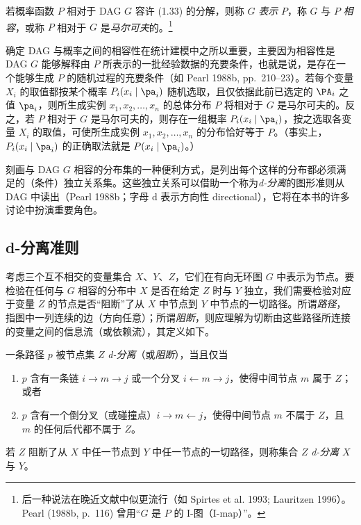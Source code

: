 \begin{definition}[马尔可夫相容]
若概率函数 $P$ 相对于 DAG $G$ 容许 \textup{(1.33)} 的分解，则称 $G$ \emph{表示} $P$，称 $G$ 与 $P$ \emph{相容}，或称 $P$ 相对于 $G$ 是\emph{马尔可夫}的。\footnote{后一种说法在晚近文献中似更流行（如 Spirtes et al. 1993; Lauritzen 1996）。Pearl (1988b, p.~116) 曾用“$G$ 是 $P$ 的 I-图（I-map）”。}
\end{definition}

确定 DAG 与概率之间的相容性在统计建模中之所以重要，主要因为相容性是 DAG $G$ 能够解释由 $P$ 所表示的一批经验数据的充要条件，也就是说，是存在一个能够生成 $P$ 的随机过程的充要条件（如 Pearl 1988b, pp.~210--23）。若每个变量 $X_i$ 的取值都按某个概率 $P_i(x_i\mid\pa_i)$ 随机选取，且仅依据此前已选定的 $\PA_i$ 之值 $\pa_i$，则所生成实例 $x_1,x_2,\dots,x_n$ 的总体分布 $P$ 将相对于 $G$ 是马尔可夫的。反之，若 $P$ 相对于 $G$ 是马尔可夫的，则存在一组概率 $P_i(x_i\mid\pa_i)$，按之选取各变量 $X_i$ 的取值，可使所生成实例 $x_1,x_2,\dots,x_n$ 的分布恰好等于 $P$。（事实上，$P_i(x_i\mid\pa_i)$ 的正确取法就是 $P(x_i\mid\pa_i)$。）

刻画与 DAG $G$ 相容的分布集的一种便利方式，是列出每个这样的分布都必须满足的（条件）独立关系集。这些独立关系可以借助一个称为\emph{d-分离}的图形准则从 DAG 中读出（Pearl 1988b；字母 d 表示方向性 directional），它将在本书的许多讨论中扮演重要角色。

\subsection{d-分离准则}

考虑三个互不相交的变量集合 $X$、$Y$、$Z$，它们在有向无环图 $G$ 中表示为节点。要检验在任何与 $G$ 相容的分布中 $X$ 是否在给定 $Z$ 时与 $Y$ 独立，我们需要检验对应于变量 $Z$ 的节点是否“阻断”了从 $X$ 中节点到 $Y$ 中节点的一切路径。所谓\emph{路径}，指图中一列连续的边（方向任意）；所谓\emph{阻断}，则应理解为切断由这些路径所连接的变量之间的信息流（或依赖流），其定义如下。

\begin{definition}[d-分离]
一条路径 $p$ 被节点集 $Z$ \emph{d-分离}（或\emph{阻断}），当且仅当
\begin{enumerate}[label=\arabic*.]
\item $p$ 含有一条链 $i\to m\to j$ 或一个分叉 $i\leftarrow m\to j$，使得中间节点 $m$ 属于 $Z$；或者
\item $p$ 含有一个倒分叉（或碰撞点）$i\to m\leftarrow j$，使得中间节点 $m$ 不属于 $Z$，且 $m$ 的任何后代都不属于 $Z$。
\end{enumerate}
若 $Z$ 阻断了从 $X$ 中任一节点到 $Y$ 中任一节点的一切路径，则称集合 $Z$ \emph{d-分离} $X$ 与 $Y$。
\end{definition}

